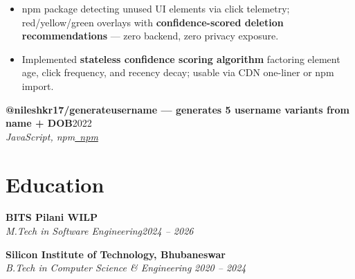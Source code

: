 \documentclass[letterpaper,10.5pt]{article}
\newcommand{\resumeSubheading}[4]{
  \vspace{2pt}
  {\small\textbf{#1}}\hfill{\small #4}\\[-1pt]
  {\footnotesize\textit{#3}}\hfill{\footnotesize\textit{#2}}\\[-5pt]
}
\newcommand{\resumeItem}[1]{\item\small{#1}}
\newcommand{\resumeItemListStart}{
  \begin{itemize}[leftmargin=1.1em, itemsep=0pt, topsep=2pt, parsep=0pt]
}
\newcommand{\resumeItemListEnd}{\end{itemize}\vspace{-1pt}}
\begin{document}
\resumeItemListStart
  \resumeItem{npm package detecting unused UI elements via click telemetry; red/yellow/green overlays with \textbf{confidence-scored deletion recommendations} --- zero backend, zero privacy exposure.}
  \resumeItem{Implemented \textbf{stateless confidence scoring algorithm} factoring element age, click frequency, and recency decay; usable via CDN one-liner or npm import.}
\resumeItemListEnd

\resumeSubheading
{{@nileshkr17/generateusername} {\normalfont\footnotesize --- generates 5 username variants from name + DOB}}{\href{https://www.npmjs.com/package/@nileshkr17/generateusername}{\faNpm\ npm}}
{JavaScript, npm}{2022}

\vspace{4pt}
\vspace{4pt}
\vspace{4pt}
\section{Education}

\resumeSubheading
{BITS Pilani WILP}{2024 -- 2026}
{M.Tech in Software Engineering}{}

\vspace{1pt}

\resumeSubheading
{Silicon Institute of Technology, Bhubaneswar}{2020 -- 2024}
{B.Tech in Computer Science \& Engineering }{}
\end{document}
